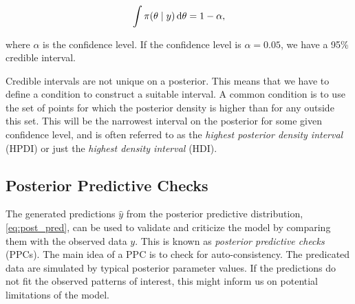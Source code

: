 \begin{equation*}
    \int \pi \qty(\theta \mid y) \dd{\theta} = 1 - \alpha,
\end{equation*}

where $\alpha$ is the confidence level. If the confidence level is $\alpha=0.05$, we have a 95\% credible interval. 

Credible intervals are not unique on a posterior. This means that we have to define a condition to construct a suitable interval. A common condition is to use the set of points for which the posterior density is higher than for any outside this set. This will be the narrowest interval on the posterior for some given confidence level, and is often referred to as the \textit{highest posterior density interval} (HPDI) or just the \textit{highest density interval} (HDI). 


\subsection{Posterior Predictive Checks}

The generated predictions $\hat{y}$ from the posterior predictive distribution, \autoref{eq:post_pred}, can be used to validate and criticize the model by comparing them with the observed data $y$. This is known as \textit{posterior predictive checks} (PPCs). The main idea of a PPC is to check for auto-consistency. The predicated data are simulated by typical posterior parameter values. If the predictions do not fit the observed patterns of interest, this might inform us on potential limitations of the model.  












